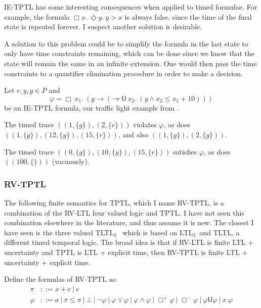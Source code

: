 \documentclass[a4paper]{article}
\newcommand{\U}{\mathsf{U}}
\newcommand{\sn}{\bigcirc^+}
\newcommand{\wn}{\bigcirc^-}
\newcommand{\ltlt}{LTL$_3$}
\begin{document}
\begin{remk}
IE-TPTL has some interesting consequences when applied to timed formulae. For example, the formula $\Box x.~ \Diamond y.~ y > x$ is always false, since the time of the final state is repeated forever. I suspect another solution is desirable.

A solution to this problem could be to simplify the formula in the last state to only have time constraints remaining, which can be done since we know that the state will remain the same in an infinite extension. One would then pass the time constraints to a quantifier elimination procedure in order to make a decision.
\end{remk}

\begin{eg}\label{ietptleg}
  Let $r,y,g\in P$ and \[\varphi = \Box ~x_1.~ (g \to (\neg r ~\U~ x_2.~ (y \land x_2 \leq x_1 + 10) ))\] be an IE-TPTL formula, our traffic light example from .

  The timed trace $((1,\{g\}),(2,\{r\}))$ violates $\varphi$, as does $((1,\{g\}),(12,\{y\}),(15,\{r\}))$, and also $((1,\{g\}),(2,\{g\}))$.

  The timed trace $((0,\{g\}),(10,\{y\}),(15,\{r\}))$ satisfies $\varphi$, as does $((100,\{\}))$ (vacuously).
\end{eg}

\subsubsection{RV-TPTL} The following finite semantics for TPTL, which I name RV-TPTL, is a combination of the RV-LTL four valued logic and TPTL. I have not seen this combination elsewhere in the literature, and thus assume it is new. The closest I have seen is the three valued TLTL$_3$~\autocite[6]{arafat2005runtime} which is based on \ltlt\ and TLTL, a different timed temporal logic. The broad idea is that if RV-LTL is finite LTL + uncertainty and TPTL is LTL + explicit time, then RV-TPTL is finite LTL + uncertainty + explicit time.

\begin{defn}

  Define the formulas of RV-TPTL as:
  \begin{align*}
    \pi &::= x + c ~|~ c\\
    \varphi &::= a ~|~ \pi \leq \pi ~|~ \bot ~|~ \neg \varphi ~|~\varphi \lor \varphi ~|~ \varphi \land \varphi ~|~ \sn \varphi ~|~ \wn \varphi ~|~ \varphi \U \varphi ~|~ x. \varphi
  \end{align*}
\end{defn}
\end{document}
